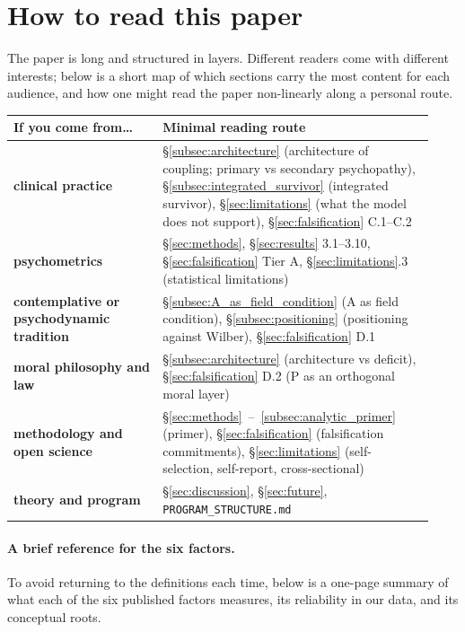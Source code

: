 \section*{How to read this paper}
\label{sec:reading_guide}

The paper is long and structured in layers. Different readers come with different interests; below is a short map of which sections carry the most content for each audience, and how one might read the paper non-linearly along a personal route.

\begin{center}
\begin{tabular}{p{0.33\linewidth}p{0.60\linewidth}}
\toprule
\textbf{If you come from\dots} & \textbf{Minimal reading route} \\
\midrule
\textbf{clinical practice} & §\ref{subsec:architecture} (architecture of coupling; primary vs secondary psychopathy), §\ref{subsec:integrated_survivor} (integrated survivor), §\ref{sec:limitations} (what the model does not support), §\ref{sec:falsification} C.1--C.2 \\
\midrule
\textbf{psychometrics} & §\ref{sec:methods}, §\ref{sec:results} 3.1--3.10, §\ref{sec:falsification} Tier A, §\ref{sec:limitations}.3 (statistical limitations) \\
\midrule
\textbf{contemplative or psychodynamic tradition} & §\ref{subsec:A_as_field_condition} (A as field condition), §\ref{subsec:positioning} (positioning against Wilber), §\ref{sec:falsification} D.1 \\
\midrule
\textbf{moral philosophy and law} & §\ref{subsec:architecture} (architecture vs deficit), §\ref{sec:falsification} D.2 (P as an orthogonal moral layer) \\
\midrule
\textbf{methodology and open science} & §\ref{sec:methods}~--~\ref{subsec:analytic_primer} (primer), §\ref{sec:falsification} (falsification commitments), §\ref{sec:limitations} (self-selection, self-report, cross-sectional) \\
\midrule
\textbf{theory and program} & \S\ref{sec:discussion}, §\ref{sec:future}, \texttt{PROGRAM\_STRUCTURE.md} \\
\bottomrule
\end{tabular}
\end{center}

\paragraph{A brief reference for the six factors.} To avoid returning to the definitions each time, below is a one-page summary of what each of the six published factors measures, its reliability in our data, and its conceptual roots.

